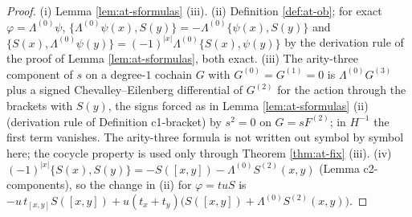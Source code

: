 \documentclass[11pt]{article}
\numberwithin{equation}{section}
\theoremstyle{plain}
\theoremstyle{definition}
\begin{document}
\begin{proof}
(i) Lemma \ref{lem:at-sformulas} (iii). (ii) Definition \ref{def:at-ob}; for exact $\varphi=\Lambda^{(0)}\psi$, $\{\Lambda^{(0)}\psi(x),S(y)\}=-\Lambda^{(0)}\{\psi(x),S(y)\}$ and $\{S(x),\Lambda^{(0)}\psi(y)\}=(-1)^{|x|}\Lambda^{(0)}\{S(x),\psi(y)\}$ by the derivation rule of the proof of Lemma \ref{lem:at-sformulas}, both exact. (iii) The arity-three component of $s$ on a degree-$1$ cochain $G$ with $G^{(0)}=G^{(1)}=0$ is $\Lambda^{(0)}G^{(3)}$ plus a signed Chevalley--Eilenberg differential of $G^{(2)}$ for the action through the brackets with $S(y)$, the signs forced as in Lemma \ref{lem:at-sformulas} (ii) (derivation rule of Definition c1-bracket) by $s^2=0$ on $G=sF^{(2)}$; in $H^{-1}$ the first term vanishes. The arity-three formula is not written out symbol by symbol here; the cocycle property is used only through Theorem \ref{thm:at-fix} (iii). (iv) $(-1)^{|x|}\{S(x),S(y)\}=-S([x,y])-\Lambda^{(0)}S^{(2)}(x,y)$ (Lemma c2-components), so the change in (ii) for $\varphi=tuS$ is $-u\,t_{[x,y]}S([x,y])+u(t_x+t_y)\big(S([x,y])+\Lambda^{(0)}S^{(2)}(x,y)\big)$.
\end{proof}
\end{document}
